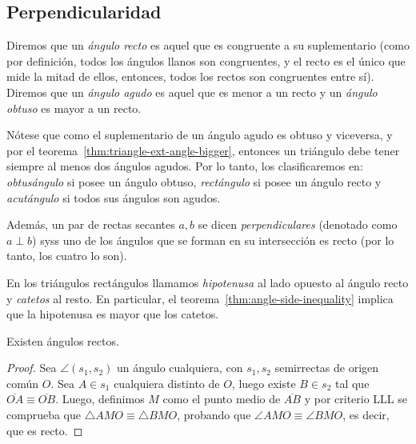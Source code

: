 \documentclass[11pt,a4paper]{book}
\begin{document}
\subsection*{Perpendicularidad}
\begin{mydef}
Diremos que un \textit{ángulo recto} es aquel que es congruente a su suplementario (como por definición, todos los ángulos llanos son congruentes, y el recto es el único que mide la mitad de ellos, entonces, todos los rectos son congruentes entre sí). Diremos que un \textit{ángulo agudo} es aquel que es menor a un recto y un \textit{ángulo obtuso} es mayor a un recto.

	Nótese que como el suplementario de un ángulo agudo es obtuso y viceversa, y por el teorema~\ref{thm:triangle-ext-angle-bigger}, entonces un triángulo debe tener siempre al menos dos ángulos agudos. Por lo tanto, los clasificaremos en: \textit{obtusángulo} si posee un ángulo obtuso, \textit{rectángulo} si posee un ángulo recto y \textit{acutángulo} si todos sus ángulos son agudos.

Además, un par de rectas secantes $a,b$ se dicen \textit{perpendiculares} (denotado como $a\perp b$) syss uno de los ángulos que se forman en su intersección es recto (por lo tanto, los cuatro lo son).
\end{mydef}
En los triángulos rectángulos llamamos \textit{hipotenusa} al lado opuesto al ángulo recto y \textit{catetos} al resto. En particular, el teorema~\ref{thm:angle-side-inequality} implica que la hipotenusa es mayor que los catetos.
\begin{thm}\label{thm:right-angles-exist}
Existen ángulos rectos.
\end{thm}
\begin{proof}
Sea $\angle(s_1,s_2)$ un ángulo cualquiera, con $s_1,s_2$ semirrectas de origen común $O$. Sea $A\in s_1$ cualquiera distinto de $O$, luego existe $B\in s_2$ tal que $\overline{OA}\equiv\overline{OB}$. Luego, definimos $M$ como el punto medio de $\overline{AB}$ y por criterio LLL se comprueba que $\triangle AMO\equiv\triangle BMO$, probando que $\angle AMO\equiv\angle BMO$, es decir, que es recto.
\end{proof}
\end{document}
